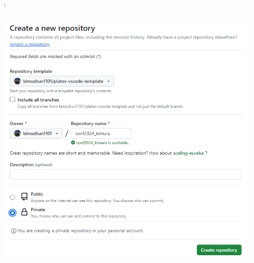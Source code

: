 \documentclass[aspectratio=169,dvipdfmx,cjk]{beamer}
\begin{document}
\begin{frame}{\insertsection \thesubsection: \insertsubsection}
\begin{columns}
\begin{column}{0.28\textwidth}
      \includegraphics[width=1.0\linewidth]{fig/create-repo.png}
    \end{column}
  \end{columns}
\end{frame}
\end{document}
